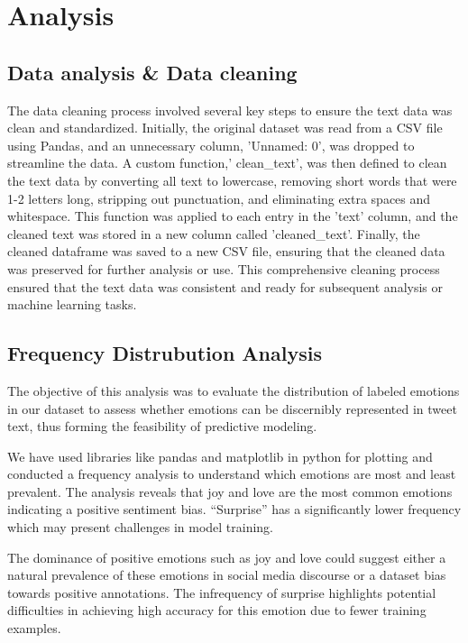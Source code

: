 \section{Analysis\label{sec:Analysis}}

\subsection{Data analysis \& Data cleaning}

The data cleaning process involved several key steps to ensure the text data was clean and standardized. Initially, the original dataset was read from a CSV file using Pandas, and an unnecessary column, 'Unnamed: 0', was dropped to streamline the data. A custom function,' clean\_text', was then defined to clean the text data by converting all text to lowercase, removing short words that were 1-2 letters long, stripping out punctuation, and eliminating extra spaces and whitespace. This function was applied to each entry in the 'text' column, and the cleaned text was stored in a new column called 'cleaned\_text'. Finally, the cleaned dataframe was saved to a new CSV file, ensuring that the cleaned data was preserved for further analysis or use. This comprehensive cleaning process ensured that the text data was consistent and ready for subsequent analysis or machine learning tasks.

\subsection{Frequency Distrubution Analysis}

The objective of this analysis was to evaluate the distribution of labeled emotions in our dataset to assess whether emotions can be discernibly represented in tweet text, thus forming the feasibility of predictive modeling.

We have used libraries like pandas and matplotlib in python for plotting and conducted a frequency analysis to understand which emotions are most and least prevalent. The analysis reveals that joy and love are the most common emotions indicating a positive sentiment bias. “Surprise” has a significantly lower frequency which may present challenges in model training.

The dominance of positive emotions such as joy and love could suggest either a natural prevalence of these emotions in social media discourse or a dataset bias towards positive annotations. The infrequency of surprise highlights potential difficulties in achieving high accuracy for this emotion due to fewer training examples.


